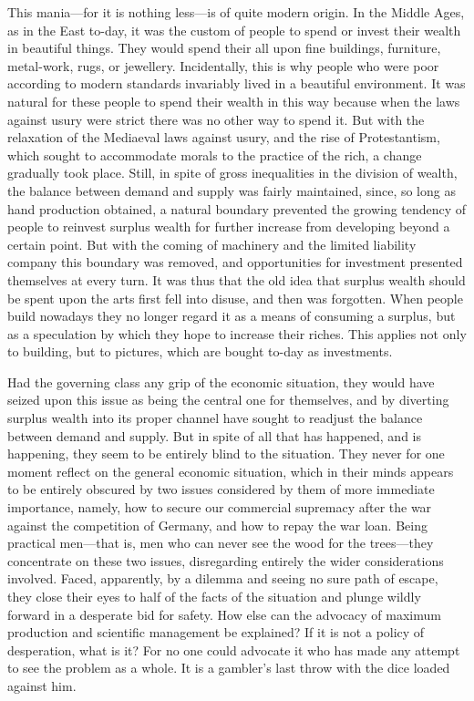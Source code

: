 \documentclass{book}
\begin{document}
This mania—for it is nothing less—is of quite modern origin. In the Middle Ages, as in the East to-day, it was the custom of people to spend or invest their wealth in beautiful things. They would spend their all upon fine buildings, furniture, metal-work, rugs, or jewellery. Incidentally, this is why people who were poor according to modern standards invariably lived in a beautiful environment. It was natural for these people to spend their wealth in this way because when the laws against usury were strict there was no other way to spend it. But with the relaxation of the Mediaeval laws against usury, and the rise of Protestantism, which sought to accommodate morals to the practice of the rich, a change gradually took place. Still, in spite of gross inequalities in the division of wealth, the balance between demand and supply was fairly maintained, since, so long as hand production obtained, a natural boundary prevented the growing tendency of people to reinvest surplus wealth for further increase from developing beyond a certain point. But with the coming of machinery and the limited liability company this boundary was removed, and opportunities for investment presented themselves at every turn. It was thus that the old idea that surplus wealth should be spent upon the arts first fell into disuse, and then was forgotten. When people build nowadays they no longer regard it as a means of consuming a surplus, but as a speculation by which they hope to increase their riches. This applies not only to building, but to pictures, which are bought to-day as investments.\footnotemark[1]

Had the governing class any grip of the economic situation, they would have seized upon this issue as being the central one for themselves, and by diverting surplus wealth into its proper channel have sought to readjust the balance between demand and supply. But in spite of all that has happened, and is happening, they seem to be entirely blind to the situation. They never for one moment reflect on the general economic situation, which in their minds appears to be entirely obscured by two issues considered by them of more immediate importance, namely, how to secure our commercial supremacy after the war against the competition of Germany, and how to repay the war loan. Being practical men—that is, men who can never see the wood for the trees—they concentrate on these two issues, disregarding entirely the wider considerations involved. Faced, apparently, by a dilemma and seeing no sure path of escape, they close their eyes to half of the facts of the situation and plunge wildly forward in a desperate bid for safety. How else can the advocacy of maximum production and scientific management be explained? If it is not a policy of desperation, what is it? For no one could advocate it who has made any attempt to see the problem as a whole. It is a gambler’s last throw with the dice loaded against him.
\end{document}
